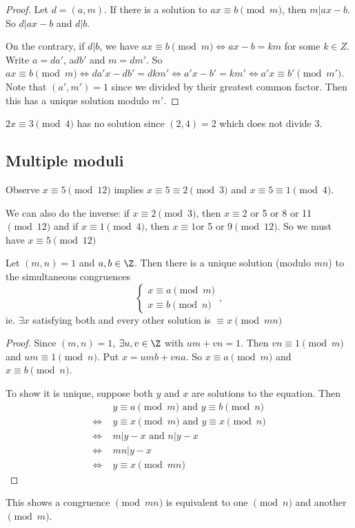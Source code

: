 \documentclass[a4paper]{article}
\begin{document}
  \begin{proof}
    Let $d = (a, m)$. If there is a solution to $ax \equiv b\pmod m$, then $m | ax - b$. So $d | ax - b$ and $d | b$.

    On the contrary, if $d | b$, we have $ax \equiv b\pmod m \Leftrightarrow ax - b = km$ for some $k\in Z$. Write $a = da'$, a$db'$ and $m = dm'$. So $ax\equiv b\pmod m \Leftrightarrow da'x - db' = dkm'\Leftrightarrow a'x - b' = km'\Leftrightarrow a'x \equiv b'\pmod {m'}$. Note that $(a', m') = 1$ since we divided by their greatest common factor. Then this has a unique solution modulo $m'$.
  \end{proof}

  \begin{eg}
    $2x \equiv 3 \pmod 4$ has no solution since $(2, 4) = 2$ which does not divide $3$.
  \end{eg}

  \subsection{Multiple moduli}
  Observe $x\equiv 5\pmod {12}$ implies $x\equiv 5\equiv 2 \pmod 3$ and $x\equiv 5\equiv 1\pmod 4$.

  We can also do the inverse: if $x \equiv 2\pmod 3$, then $x\equiv 2$ or 5 or 8 or 11 $\pmod {12}$ and if $x \equiv 1 \pmod 4$, then $x\equiv 1 $or 5 or 9$\pmod 12$. So we must have $x \equiv 5\pmod {12}$

  \begin{thm}
    Let $(m, n) = 1$ and $a, b\in \Z$. Then there is a unique solution (modulo $mn$) to the simultaneous congruences
    \[
      \begin{cases}x\equiv a\pmod m \\ x\equiv b\pmod n \end{cases},
    \]
    ie. $\exists x$ satisfying both and every other solution is $\equiv x \pmod {mn}$
  \end{thm}

  \begin{proof}
    Since $(m, n) = 1$, $\exists u, v\in \Z$ with $um + vn = 1$. Then $vn \equiv 1\pmod m$ and $um \equiv 1 \pmod n$. Put $x = umb + vna$. So $x\equiv a\pmod m$ and $x\equiv b\pmod n$.

    To show it is unique, suppose both $y$ and $x$ are solutions to the equation. Then
    \begin{align*}
      &\; y \equiv a\pmod m \text{ and } y \equiv b\pmod n\\
      \Leftrightarrow &\; y \equiv x\pmod m \text{ and } y\equiv x\pmod n\\
      \Leftrightarrow &\; m | y - x\text{ and } n | y - x\\
      \Leftrightarrow &\; mn | y - x\\
      \Leftrightarrow &\; y \equiv x\pmod {mn}
    \end{align*}
  \end{proof}
  \note This shows a congruence $\pmod {mn}$  is equivalent to one $\pmod n$ and another $\pmod m$.
\end{document}
